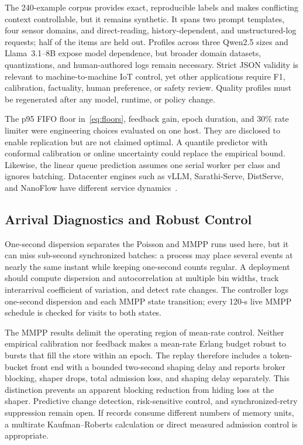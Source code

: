 \documentclass[journal]{IEEEtran}
\begin{document}
The 240-example corpus provides exact, reproducible labels and makes conflicting context controllable, but it remains synthetic. It spans two prompt templates, four sensor domains, and direct-reading, history-dependent, and unstructured-log requests; half of the items are held out. Profiles across three Qwen2.5 sizes and Llama~3.1--8B expose model dependence, but broader domain datasets, quantizations, and human-authored logs remain necessary. Strict JSON validity is relevant to machine-to-machine IoT control, yet other applications require F1, calibration, factuality, human preference, or safety review. Quality profiles must be regenerated after any model, runtime, or policy change.

The p95 FIFO floor in~\eqref{eq:floors}, feedback gain, epoch duration, and 30\% rate limiter were engineering choices evaluated on one host. They are disclosed to enable replication but are not claimed optimal. A quantile predictor with conformal calibration or online uncertainty could replace the empirical bound. Likewise, the linear queue prediction assumes one serial worker per class and ignores batching. Datacenter engines such as vLLM, Sarathi-Serve, DistServe, and NanoFlow have different service dynamics~\cite{kwon2023vllm,agrawal2024sarathi,zhong2024distserve,zhu2025nanoflow}.

\subsection{Arrival Diagnostics and Robust Control}

One-second dispersion separates the Poisson and MMPP runs used here, but it can miss sub-second synchronized batches: a process may place several events at nearly the same instant while keeping one-second counts regular. A deployment should compute dispersion and autocorrelation at multiple bin widths, track interarrival coefficient of variation, and detect rate changes. The controller logs one-second dispersion and each MMPP state transition; every 120-s live MMPP schedule is checked for visits to both states.

The MMPP results delimit the operating region of mean-rate control. Neither empirical calibration nor feedback makes a mean-rate Erlang budget robust to bursts that fill the store within an epoch. The replay therefore includes a token-bucket front end with a bounded two-second shaping delay and reports broker blocking, shaper drops, total admission loss, and shaping delay separately. This distinction prevents an apparent blocking reduction from hiding loss at the shaper. Predictive change detection, risk-sensitive control, and synchronized-retry suppression remain open. If records consume different numbers of memory units, a multirate Kaufman--Roberts calculation or direct measured admission control is appropriate.
\end{document}
